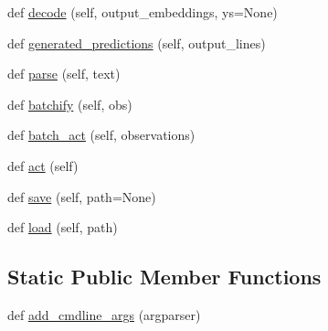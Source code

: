 \begin{DoxyCompactItemize}
\item 
def \hyperlink{classprojects_1_1memnn__feedback_1_1agent_1_1memnn__feedback_1_1MemnnFeedbackAgent_a8e62a0326b38fe1ec6b7ef785638fd98}{decode} (self, output\+\_\+embeddings, ys=None)
\item 
def \hyperlink{classprojects_1_1memnn__feedback_1_1agent_1_1memnn__feedback_1_1MemnnFeedbackAgent_a094d93392d7c4954d4762cde09cf8b0a}{generated\+\_\+predictions} (self, output\+\_\+lines)
\item 
def \hyperlink{classprojects_1_1memnn__feedback_1_1agent_1_1memnn__feedback_1_1MemnnFeedbackAgent_abe550254c04f404d488de04a0def4df1}{parse} (self, text)
\item 
def \hyperlink{classprojects_1_1memnn__feedback_1_1agent_1_1memnn__feedback_1_1MemnnFeedbackAgent_a9fafb9b83a4dcb66d07f40a70826b594}{batchify} (self, obs)
\item 
def \hyperlink{classprojects_1_1memnn__feedback_1_1agent_1_1memnn__feedback_1_1MemnnFeedbackAgent_af47447adf3b049849603021a9aa03fef}{batch\+\_\+act} (self, observations)
\item 
def \hyperlink{classprojects_1_1memnn__feedback_1_1agent_1_1memnn__feedback_1_1MemnnFeedbackAgent_ac5b3aecbd5c3b8e5cd4771d892274e7b}{act} (self)
\item 
def \hyperlink{classprojects_1_1memnn__feedback_1_1agent_1_1memnn__feedback_1_1MemnnFeedbackAgent_a2e17ab619266912c4294886a57645399}{save} (self, path=None)
\item 
def \hyperlink{classprojects_1_1memnn__feedback_1_1agent_1_1memnn__feedback_1_1MemnnFeedbackAgent_ad641f1d7c6d29c713c48a41ad8369c49}{load} (self, path)
\end{DoxyCompactItemize}
\subsection*{Static Public Member Functions}
\begin{DoxyCompactItemize}
\item 
def \hyperlink{classprojects_1_1memnn__feedback_1_1agent_1_1memnn__feedback_1_1MemnnFeedbackAgent_ac77a63329c6421026ee33f56d1169c5c}{add\+\_\+cmdline\+\_\+args} (argparser)
\end{DoxyCompactItemize}
